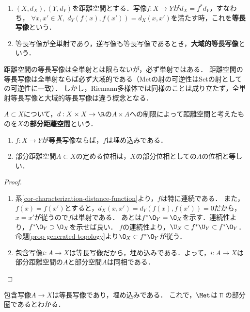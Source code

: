 \documentclass[uplatex,dvipdfmx]{jsreport}
\begin{document}
\begin{definition}\mbox{}
    \begin{enumerate}
        \item $(X,d_X),(Y,d_Y)$を距離空間とする．写像$f:X\to Y$が$d_X=f^*d_Y$，すなわち，
        $\forall x,x'\in X,\; d_Y(f(x),f(x'))=d_X(x,x')$を満たす時，これを\textbf{等長写像}という．
        \item 等長写像が全単射であり，逆写像も等長写像であるとき，\textbf{大域的等長写像}という．
    \end{enumerate}
\end{definition}
\begin{remark}
    距離空間の等長写像は全単射とは限らないが，必ず単射ではある．
    距離空間の等長写像は全単射ならば必ず大域的である（Metの射の可逆性はSetの射としての可逆性に一致）．
    しかし，Riemann多様体では同様のことは成り立たず，全単射等長写像と大域的等長写像は違う概念となる．
\end{remark}

\begin{definition}[部分距離空間]
    $A\subset X$について，$d:X\times X\to\R$の$A\times A$への制限によって距離空間と考えたものを$X$の\textbf{部分距離空間}という．
\end{definition}

\begin{proposition}\label{prop-部分距離空間のwell-definedness}\mbox{}
    \begin{enumerate}
        \item $f:X\to Y$が等長写像ならば，$f$は埋め込みである．
        \item 部分距離空間$A\subset X$の定める位相は，$X$の部分位相としての$A$の位相と等しい．
    \end{enumerate}
\end{proposition}
\begin{proof}\mbox{}
    \begin{enumerate}
        \item 系\ref{cor-characterization-distance-function}より，$f$は特に連続である．
        また，$f(x)=f(x')$とすると，$d_X(x,x')=d_Y(f(x),f(x'))=0$だから，$x=x'$が従うので$f$は単射である．
        あとは$f^*\O_Y=\O_X$を示す．連続性より，$f^*\O_Y\supset\O_X$を示せば良い．
        $f$の連続性より，$\U_X\subset f^*\U_Y\subset f^*\O_Y$．命題\ref{prop-generated-topology}より$\O_X\subset f^*\O_Y$が従う．
        \item 包含写像$i:A\to X$は等長写像だから，埋め込みである．よって，$i:A\to X$は部分距離空間の$A$と部分空間$A$は同相である．
    \end{enumerate}
\end{proof}
\begin{remark}
    包含写像$A\to X$は等長写像であり，埋め込みである．
    これで，$\Met$は$\Top$の部分圏であるとわかる．
\end{remark}
\end{document}
